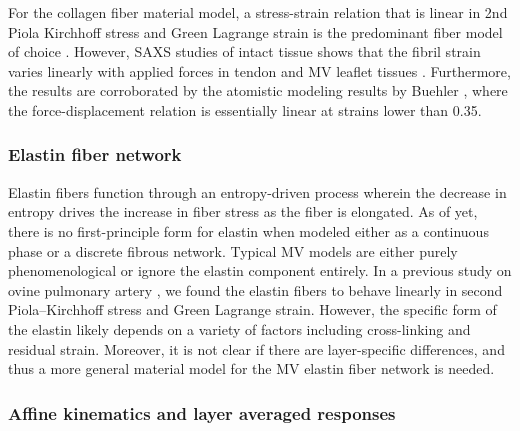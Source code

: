     
    For the collagen fiber material model, a stress-strain relation that is linear in 2nd Piola Kirchhoff stress and Green Lagrange strain is the predominant fiber model of choice \cite{sacks_incorporation_2003,lanir_structural_1979,fan_simulation_2014}. However, SAXS studies of intact tissue shows that the fibril strain varies linearly with applied forces in tendon \cite{sasaki_elongation_1996,sasaki_stress_1996} and MV leaflet tissues \cite{liao_relation_2007}. Furthermore, the results are corroborated by the atomistic modeling results by Buehler \cite{buehler_atomistic_2006}, where the force-displacement relation is essentially linear at strains lower than 0.35.
    



\subsubsection{Elastin fiber network} \label{sec:elastinconsiderations}

    Elastin fibers function through an entropy-driven process wherein the decrease in entropy drives the increase in fiber stress as the fiber is elongated. As of yet, there is no first-principle form for elastin when modeled either as a continuous phase or a discrete fibrous network. Typical MV models are either purely phenomenological or ignore the elastin component entirely. In a previous study on ovine pulmonary artery \cite{fata_insights_2014}, we found the elastin fibers to behave linearly in second Piola–Kirchhoff stress and Green Lagrange strain. However, the specific form of the elastin likely depends on a variety of factors including cross-linking and residual strain. Moreover, it is not clear if there are layer-specific differences, and thus a more general material model for the MV elastin fiber network is needed.




\subsubsection{Affine kinematics and layer averaged responses}

